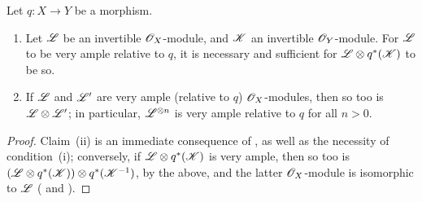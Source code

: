 \begin{corollary}[4.4.9]
\label{II.4.4.9}
Let $q:X\to Y$ be a morphism.
\begin{enumerate}
  \item Let $\mathscr{L}$ be an invertible $\mathscr{O}_X$-module, and $\mathscr{K}$ an invertible $\mathscr{O}_Y$-module.
    For $\mathscr{L}$ to be very ample relative to $q$, it is necessary and sufficient for $\mathscr{L}\otimes q^*(\mathscr{K})$ to be so.
  \item If $\mathscr{L}$ and $\mathscr{L}'$ are very ample (relative to $q$) $\mathscr{O}_X$-modules, then so too is $\mathscr{L}\otimes\mathscr{L}'$;
    in particular, $\mathscr{L}^{\otimes n}$ is very ample relative to $q$ for all $n>0$.
\end{enumerate}
\end{corollary}

\begin{proof}
Claim~(ii) is an immediate consequence of , as well as the necessity of condition~(i);
conversely, if $\mathscr{L}\otimes q^*(\mathscr{K})$ is very ample, then so too is $(\mathscr{L}\otimes q^*(\mathscr{K}))\otimes q^*(\mathscr{K}^{-1})$, by the above, and the latter $\mathscr{O}_X$-module is isomorphic to $\mathscr{L}$ ( and ).
\end{proof}

